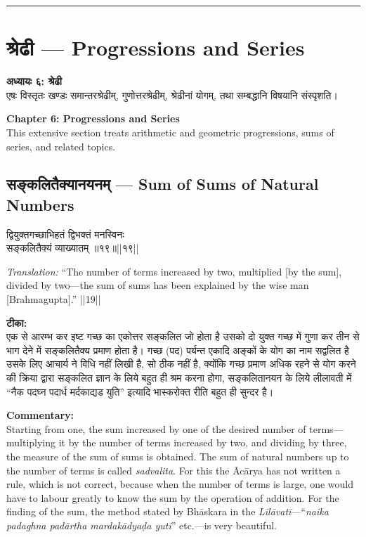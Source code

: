 \documentclass[10pt,a4paper]{article}
\newcommand{\dev}[1]{{\devanagarifont #1}}
\newcommand{\longline}{\noindent\rule{\textwidth}{0.4pt}}
\newcommand{\vnum}[1]{\hfill\textnormal{||#1||}}
\newenvironment{shloka}{%
  \begin{lrbox}{\shlokabox}
  \begin{minipage}{\dimexpr\textwidth-16pt\relax}%
  \devanagarifont\centering\setstretch{1.3}%
}{%
  \end{minipage}%
  \end{lrbox}%
  \par\medskip\noindent\fcolorbox{rulecolor}{versebg}{\usebox{\shlokabox}}\par\medskip
}
\newcommand{\bilingual}[2]{%
  \noindent%
  \begin{minipage}[t]{0.47\textwidth}%
    \setstretch{1.15}#1%
  \end{minipage}%
  \hfill%
  \vrule\hfill%
  \begin{minipage}[t]{0.47\textwidth}%
    \setstretch{1.15}#2%
  \end{minipage}%
  \par\medskip
}
\begin{document}
\vspace{0.5em}
\noindent\longline
\vspace{0.5em}

\section{\dev{श्रेढी} --- Progressions and Series}

\bilingual{%
\textbf{अध्यायः ६: श्रेढी}\\[0.3em]
एषः विस्तृतः खण्डः समान्तरश्रेढीम्, गुणोत्तरश्रेढीम्, श्रेढीनां योगम्, तथा सम्बद्धानि विषयानि संस्पृशति।
}{%
\textbf{Chapter 6: Progressions and Series}\\[0.3em]
This extensive section treats arithmetic and geometric progressions, sums of series, and related topics.
}

\subsection{\dev{सङ्कलितैक्यानयनम्} --- Sum of Sums of Natural Numbers}

\bilingual{%
\begin{shloka}
द्वियुक्तगच्छाभिहतं द्विभक्तं मनस्विनः\\
सङ्कलितैक्यं व्याख्यातम् ॥१९॥\vnum{१९}
\end{shloka}
}{%
\textit{Translation:} ``The number of terms increased by two, multiplied [by the sum], divided by two---the sum of sums has been explained by the wise man [Brahmagupta].'' ||19||
}

\bilingual{%
\textbf{टीका:}\\[0.3em]
एक से आरम्भ कर इष्ट गच्छ का एकोत्तर सङ्कलित जो होता है उसको दो युक्त गच्छ में गुणा कर तीन से भाग देने में सङ्कलितैक्य प्रमाण होता है। गच्छ (पद) पर्यन्त एकादि अङ्कों के योग का नाम सद्वलित है उसके लिए आचार्य ने विधि नहीं लिखी है, सो ठीक नहीं है, क्योंकि गच्छ प्रमाण अधिक रहने से योग करने की क्रिया द्वारा सङ्कलित ज्ञान के लिये बहुत ही श्रम करना होगा, सङ्कलितानयन के लिये लीलावती में ``नैक पदघ्न पदार्ध मर्दकाद्यड युति'' इत्यादि भास्करोक्त रीति बहुत ही सुन्दर है।
}{%
\textbf{Commentary:}\\[0.3em]
Starting from one, the sum increased by one of the desired number of terms---multiplying it by the number of terms increased by two, and dividing by three, the measure of the sum of sums is obtained. The sum of natural numbers up to the number of terms is called \textit{sadvalita}. For this the Ācārya has not written a rule, which is not correct, because when the number of terms is large, one would have to labour greatly to know the sum by the operation of addition. For the finding of the sum, the method stated by Bhāskara in the \textit{Līlāvatī}---``\textit{naika padaghna padārtha mardakādyaḍa yuti}'' etc.---is very beautiful.
}
\end{document}
